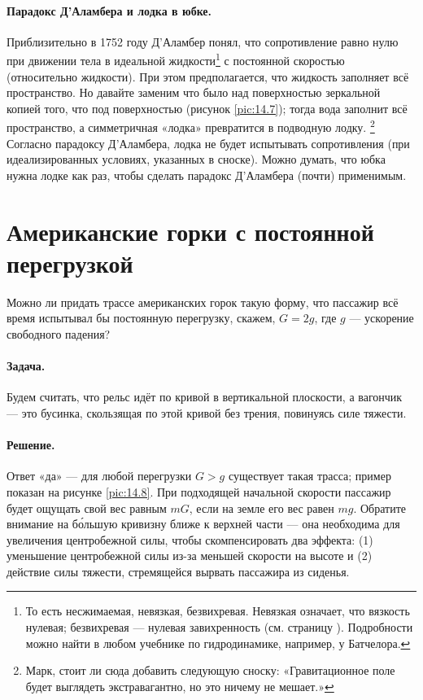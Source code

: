 \paragraph{Парадокс Д’Аламбера и лодка в юбке.}
Приблизительно в 1752 году Д’Аламбер понял,
что сопротивление равно нулю при движении тела в идеальной жидкости\footnote{То есть несжимаемая, невязкая, безвихревая.
Невязкая означает, что вязкость нулевая;
безвихревая --- нулевая завихренность (см. страницу \pageref{def:завихренность}).
Подробности можно найти в любом учебнике по гидродинамике, например, у Батчелора.}
с постоянной скоростью (относительно жидкости).
При этом предполагается, что жидкость заполняет всё пространство.
Но давайте заменим что было над поверхностью зеркальной копией того, что под поверхностью (рисунок \ref{pic:14.7});
тогда вода заполнит всё пространство, а симметричная «лодка» превратится в подводную лодку.%
\footnote{Марк, стоит ли сюда добавить следующую сноску: «Гравитационное поле будет выглядеть экстравагантно, но это ничему не мешает.» \pr}
Согласно парадоксу Д’Аламбера, лодка не будет испытывать сопротивления (при идеализированных условиях, указанных в сноске).
Можно думать, что юбка нужна лодке как раз, чтобы сделать парадокс Д’Аламбера (почти) применимым.

\section{Американские горки с постоянной перегрузкой}\label{Американские горки с постоянной перегрузкой}

Можно ли придать трассе американских горок такую форму, что пассажир всё время испытывал бы постоянную перегрузку, скажем, $G=2g$, где $g$ — ускорение свободного падения?

\paragraph{Задача.}
Будем считать, что рельс идёт по кривой в вертикальной плоскости, а вагончик — это бусинка, скользящая по этой кривой без трения, повинуясь силе тяжести.

\paragraph{Решение.}
Ответ «да» ---
для любой перегрузки $G>g$ существует такая трасса; пример показан на рисунке \ref{pic:14.8}.
При подходящей начальной скорости пассажир будет ощущать свой вес равным $mG$, если на земле его вес равен $mg$.
Обратите внимание на б\'{о}льшую кривизну ближе к верхней части — она необходима для увеличения центробежной силы, чтобы скомпенсировать два эффекта: (1) уменьшение центробежной силы из-за меньшей скорости на высоте и (2) действие силы тяжести, стремящейся вырвать пассажира из сиденья.


